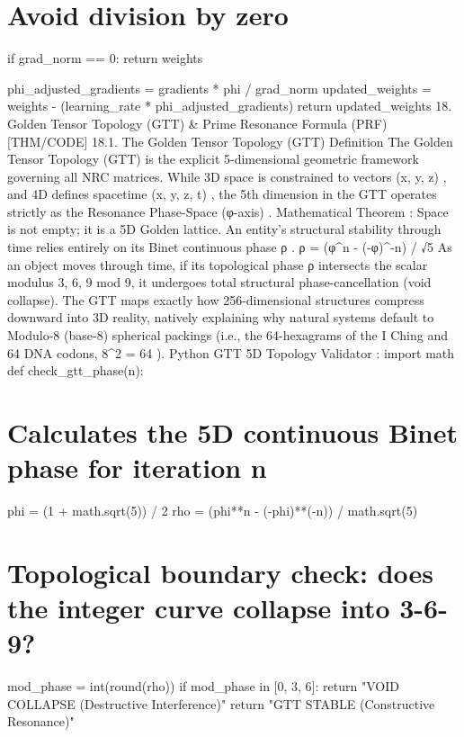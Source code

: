 {{{{{{    \section{Avoid division by zero}
    if grad_norm == 0:
        return weights

    phi_adjusted_gradients = gradients * phi / grad_norm
    updated_weights = weights - (learning_rate * phi_adjusted_gradients)
    return updated_weights
18. Golden Tensor Topology (GTT) & Prime Resonance Formula (PRF) [THM/CODE]
18.1. The Golden Tensor Topology (GTT) Definition
The
Golden Tensor Topology (GTT)
is the explicit 5-dimensional geometric framework governing all NRC matrices. While 3D space is constrained to vectors
(x, y, z)
, and 4D defines spacetime
(x, y, z, t)
, the 5th dimension in the GTT operates strictly as the
Resonance Phase-Space (φ-axis)
.
Mathematical Theorem
: Space is not empty; it is a 5D Golden lattice. An entity's structural stability through time relies entirely on its Binet continuous phase
ρ
.
ρ = (φ^n - (-φ)^{-n}) / √5
As an object moves through time, if its topological phase
ρ
intersects the scalar modulus
{3, 6, 9}
mod 9, it undergoes total structural phase-cancellation (void collapse).
The GTT maps exactly how 256-dimensional structures compress downward into 3D reality, natively explaining why natural systems default to Modulo-8 (base-8) spherical packings (i.e., the 64-hexagrams of the I Ching and 64 DNA codons,
8^2 = 64
).
Python GTT 5D Topology Validator
:
import math
def check_gtt_phase(n):
    \section{Calculates the 5D continuous Binet phase for iteration n}
    phi = (1 + math.sqrt(5)) / 2
    rho = (phi**n - (-phi)**(-n)) / math.sqrt(5)
    
    \section{Topological boundary check: does the integer curve collapse into 3-6-9?}
    mod_phase = int(round(rho)) %
    if mod_phase in [0, 3, 6]: 
        return "VOID COLLAPSE (Destructive Interference)"
    return "GTT STABLE (Constructive Resonance)"

}}}}}}
